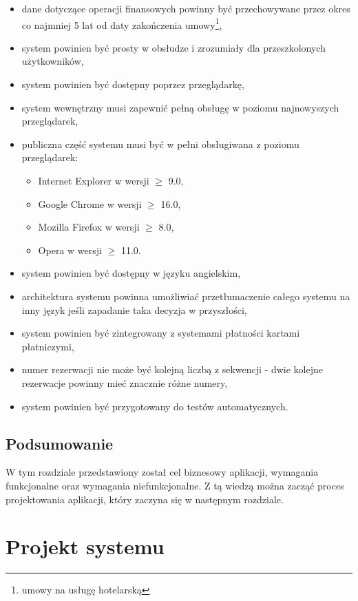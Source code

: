 \documentclass[a4paper,onecolumn,oneside,11pt,wide,floatssmall]{mwrep}
\theoremstyle{definition}
\theoremstyle{plain}%
\theoremstyle{remark}
\begin{document}
\begin{enumerate}
\begin{itemize}
\begin{itemize}
        \end{itemize}
      \item dane dotyczące operacji finansowych powinny być przechowywane przez okres co najmniej 5 lat od daty 
      zakończenia umowy\footnote{umowy na usługę hotelarską},
      \item system powinien być prosty w obsłudze i zrozumiały dla przeszkolonych użytkowników,
      \item system powinien być dostępny poprzez przeglądarkę,
      \item system wewnętrzny musi zapewnić pełną obsługę w poziomu najnowyszych przeglądarek,
      \item publiczna część systemu musi być w pełni obsługiwana z poziomu przeglądarek:
        \begin{itemize}
          \item Internet Explorer w wersji $\geq$ 9.0,
          \item Google Chrome w wersji $\geq$ 16.0,
          \item Mozilla Firefox w wersji $\geq$ 8.0,
          \item Opera w wersji $\geq$ 11.0.
        \end{itemize}
      \item system powinien być dostępny w języku angielskim,
      \item architektura systemu powinna umożliwiać przetłumaczenie całego systemu na inny język jeśli zapadanie taka 
      decyzja w przyszłości,
      \item system powinien być zintegrowany z systemami płatności kartami płatniczymi,
      \item numer rezerwacji nie może być kolejną liczbą z sekwencji - dwie kolejne rezerwacje powinny mieć znacznie 
      różne numery,
      \item system powinien być przygotowany do testów automatycznych.
    \end{itemize}
\end{enumerate}

\section{Podsumowanie}
W tym rozdziale przedstawiony został cel biznesowy aplikacji, wymagania funkcjonalne oraz wymagania niefunkcjonalne. Z tą wiedzą można zacząć proces projektowania aplikacji, który zaczyna się w następnym rozdziale.


\chapter{Projekt systemu}
\end{document}
